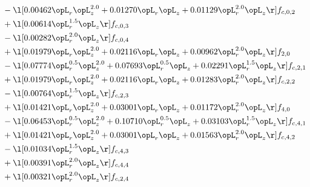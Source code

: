 \begin{alignat}{2}
& - \l[  0.00462 \opL_r \opL_z^{2.0} +  0.01270 \opL_r \opL_z +  0.01129 \opL_r^{2.0} \opL_z  \r] f_{c,0,2} \nonumber \\ 
& + \l[  0.00614 \opL_r^{1.5} \opL_z  \r] f_{c,0,3} \nonumber \\ 
& - \l[  0.00282 \opL_r^{2.0} \opL_z  \r] f_{c,0,4} \nonumber \\ 
& + \l[  0.01979 \opL_r \opL_z^{2.0} +  0.02116 \opL_r \opL_z +  0.00962 \opL_r^{2.0} \opL_z  \r] f_{2,0} \nonumber \\ 
& - \l[  0.07774 \opL_r^{0.5} \opL_z^{2.0} +  0.07693 \opL_r^{0.5} \opL_z +  0.02291 \opL_r^{1.5} \opL_z  \r] f_{c,2,1} \nonumber \\ 
& + \l[  0.01979 \opL_r \opL_z^{2.0} +  0.02116 \opL_r \opL_z +  0.01283 \opL_r^{2.0} \opL_z  \r] f_{c,2,2} \nonumber \\ 
& - \l[  0.00764 \opL_r^{1.5} \opL_z  \r] f_{c,2,3} \nonumber \\ 
& + \l[  0.01421 \opL_r \opL_z^{2.0} +  0.03001 \opL_r \opL_z +  0.01172 \opL_r^{2.0} \opL_z  \r] f_{4,0} \nonumber \\ 
& - \l[  0.06453 \opL_r^{0.5} \opL_z^{2.0} +  0.10710 \opL_r^{0.5} \opL_z +  0.03103 \opL_r^{1.5} \opL_z  \r] f_{c,4,1} \nonumber \\ 
& + \l[  0.01421 \opL_r \opL_z^{2.0} +  0.03001 \opL_r \opL_z +  0.01563 \opL_r^{2.0} \opL_z  \r] f_{c,4,2} \nonumber \\ 
& - \l[  0.01034 \opL_r^{1.5} \opL_z  \r] f_{c,4,3} \nonumber \\ 
& + \l[  0.00391 \opL_r^{2.0} \opL_z  \r] f_{c,4,4} \nonumber \\ 
& + \l[  0.00321 \opL_r^{2.0} \opL_z  \r] f_{c,2,4} \nonumber \\ 
\end{alignat} 


